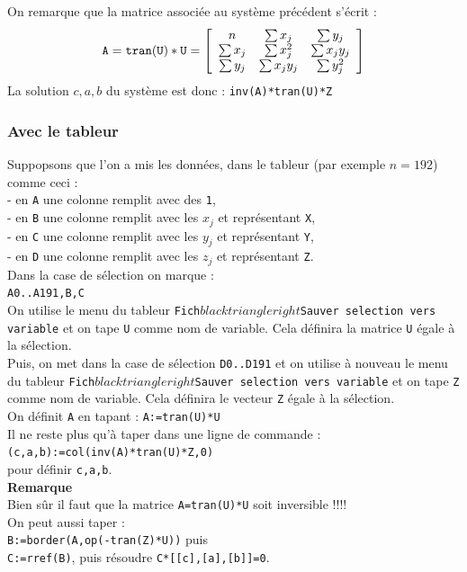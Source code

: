 \documentclass[a4paper,11pt]{book}
\begin{document}
On remarque que la matrice associ\'ee au syst\`eme pr\'ec\'edent s'\'ecrit :\\
$${\tt A=tran(U)*U}=\left[
\begin{array}{ccc}
n & \sum x_j & \sum y_j\\
\sum x_j & \sum x_j^2&\sum x_jy_j\\
\sum y_j & \sum x_jy_j &\sum y_j^2
\end{array}
\right]
$$
La solution $c,a,b$ du  syst\`eme est donc :
{\tt inv(A)*tran(U)*Z}
\subsubsection{Avec le tableur}
Suppopsons que l'on a mis les donn\'ees, dans le tableur (par exemple $n=192$)
 comme ceci :\\
- en {\tt A} une colonne remplit avec des {\tt 1},\\
- en {\tt B} une colonne remplit avec les $x_j$ et repr\'esentant 
{\tt X},\\
- en {\tt C} une colonne remplit avec les $y_j$ et repr\'esentant 
{\tt Y},\\
- en {\tt D} une colonne remplit avec les $z_j$ et repr\'esentant 
{\tt Z}.\\
Dans la case de s\'election on marque :\\
{\tt A0..A191,B,C}\\
On utilise le menu du tableur 
{\tt Fich$blacktriangleright$Sauver selection vers variable}
 et on tape {\tt U} comme nom de variable. Cela d\'efinira la matrice {\tt U}
\'egale \`a la s\'election.\\
Puis, on met dans la case de s\'election {\tt D0..D191} et on utilise \`a 
nouveau le menu du tableur 
{\tt Fich$blacktriangleright$Sauver selection vers variable}
et on tape {\tt Z} comme nom de variable. Cela d\'efinira le vecteur {\tt Z}
\'egale \`a la s\'election.\\
On d\'efinit {\tt A} en tapant : {\tt A:=tran(U)*U}\\
Il ne reste plus qu'\`a taper dans une ligne de commande :\\
{\tt (c,a,b):=col(inv(A)*tran(U)*Z,0)}\\
pour d\'efinir {\tt c,a,b}.\\
{\bf Remarque}\\
Bien s\^ur il faut que la matrice {\tt A=tran(U)*U} soit inversible !!!!\\
On peut aussi taper :\\
{\tt B:=border(A,op(-tran(Z)*U))} puis \\
{\tt C:=rref(B)},
puis r\'esoudre {\tt C*[[c],[a],[b]]=0}.
\end{document}
